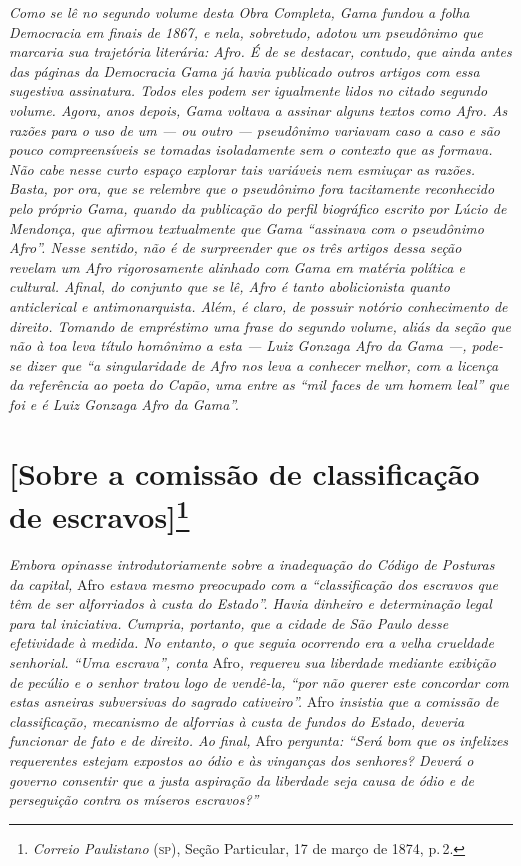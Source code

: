 \begin{argumento}\itshape
Como se lê no segundo volume desta \textnormal{Obra Completa}, Gama
fundou a folha \textnormal{Democracia} em finais de 1867, e nela, sobretudo,
adotou um pseudônimo que marcaria sua trajetória literária: Afro.
É de se destacar, contudo, que ainda antes das páginas da \textnormal{Democracia}
Gama já havia publicado outros artigos com essa sugestiva
assinatura. Todos eles podem ser igualmente lidos no citado segundo
volume. Agora, anos depois, Gama voltava a assinar alguns textos como
Afro. As razões para o uso de um --- ou outro --- pseudônimo
variavam caso a caso e são pouco compreensíveis se tomadas isoladamente
sem o contexto que as formava. Não cabe nesse curto espaço explorar tais
variáveis nem esmiuçar as razões. Basta, por ora, que se relembre que o
pseudônimo fora tacitamente reconhecido pelo próprio Gama, quando da
publicação do perfil biográfico escrito por Lúcio de Mendonça, que
afirmou textualmente que Gama ``assinava com o pseudônimo
Afro''. Nesse sentido, não é de surpreender que os três artigos
dessa seção revelam um Afro rigorosamente alinhado com Gama em
matéria política e cultural. Afinal, do conjunto que se lê, Afro é
tanto abolicionista quanto anticlerical e antimonarquista. Além,
é claro, de possuir notório conhecimento de direito. Tomando de
empréstimo uma frase do segundo volume, aliás da seção que não à toa
leva título homônimo a esta --- Luiz Gonzaga Afro da Gama
---, pode-se dizer que ``a singularidade de Afro nos leva a
conhecer melhor, com a licença da referência ao poeta do Capão, uma
entre as ``mil faces de um homem leal'' que foi e é Luiz Gonzaga Afro
da Gama''.
\end{argumento}

\chapter{{[}Sobre a comissão de classificação 
de escravos{]}\footnote{\emph{Correio Paulistano} (\textsc{sp}), Seção Particular, 17 de março de 1874, p.\,2.}} %

\begin{didascalia}
\emph{Embora opinasse introdutoriamente sobre a inadequação do Código de
Posturas da capital,} Afro \emph{estava mesmo preocupado com a
``classificação dos escravos que têm de ser alforriados à custa do
Estado''. Havia dinheiro e determinação legal para tal iniciativa.
Cumpria, portanto, que a cidade de São Paulo desse efetividade à medida.
No entanto, o que seguia ocorrendo era a velha crueldade senhorial. ``Uma
escrava'', conta} Afro\emph{, requereu sua liberdade mediante exibição de
pecúlio e o senhor tratou logo de vendê-la, ``por não querer este
concordar com estas asneiras subversivas do sagrado cativeiro''.} Afro
\emph{insistia que a comissão de classificação, mecanismo de alforrias à
custa de fundos do Estado, deveria funcionar de fato e de direito. Ao
final,} Afro \emph{pergunta: ``Será bom que os infelizes requerentes
estejam expostos ao ódio e às vinganças dos senhores? Deverá o governo
consentir que a justa aspiração da liberdade seja causa de ódio e de
perseguição contra os míseros escravos?''}
\end{didascalia}

